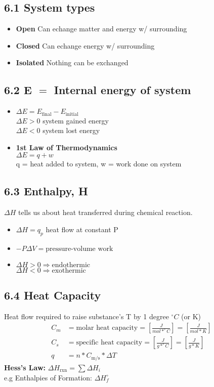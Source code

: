 \subsection{6.1 System types}
    \begin{itemize}
        \item \textbf{Open} Can echange matter and energy w/ surrounding
        \item \textbf{Closed} Can echange energy w/ surrounding
        \item \textbf{Isolated} Nothing can be exchanged
    \end{itemize}

\subsection{6.2 E $=$ Internal energy of system}
    \begin{itemize}
        \item $\Delta E = E_\text{final} - E_\text{initial}$\\
            $\Delta E > 0$ system gained energy\\
            $\Delta E < 0$ system lost energy
        \item \textbf{1st Law of Thermodynamics}\\
            $\Delta E = q + w$\\ 
            q = heat added to system, w = work done on system
    \end{itemize}

\subsection{6.3 Enthalpy, H}
    $\Delta H$ tells us about heat transferred during chemical reaction.
    \begin{itemize}
        \item $\Delta H = q_p$ heat flow at constant P
        \item $-P \Delta V = \text{pressure-volume work}$
        \item $\Delta H > 0 \Rightarrow \text{endothermic}$\\
                $\Delta H < 0 \Rightarrow \text{exothermic}$
    \end{itemize}

\subsection{6.4 Heat Capacity}
    Heat flow required to raise substance's T by 1 degree $^\circ C$ (or K)
    \begin{align*}
        C_m & = \text{molar heat capacity} = \left[\frac{J}{mol* ^\circ C}\right] = \left[\frac{J}{mol*K}\right]\\
        C_s & = \text{specific heat capacity} = \left[\frac{J}{g* ^\circ C}\right] = \left[\frac{J}{g*K}\right]\\
        q & = n*C_\text{m/s}*\Delta T
    \end{align*}
    \textbf{Hess's Law:} $\Delta H_\text{rxn} = \sum \Delta H_i$\\
    e.g Enthalpies of Formation: $\Delta H^\circ_f$

